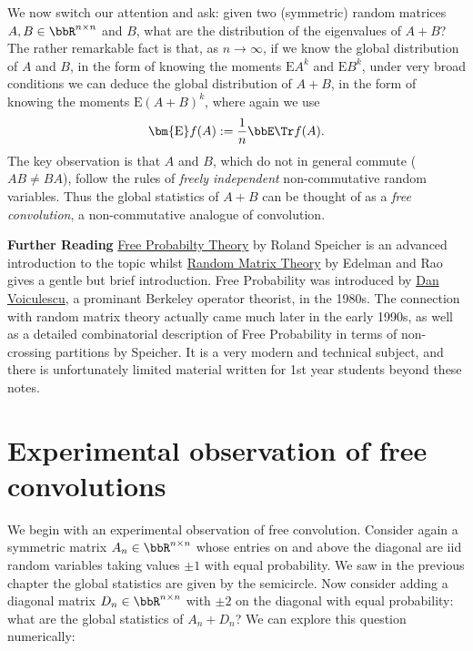 We now switch our attention and ask: given two (symmetric) random matrices $A, B \ensuremath{\in} \ensuremath{\bbR}^{n \ensuremath{\times} n}$  and $B$, what are the distribution of the eigenvalues of $A+B$?  The rather remarkable fact is that, as $n \ensuremath{\rightarrow} \ensuremath{\infty}$,  if we know the global distribution of $A$ and $B$, in the form of knowing the moments $\ensuremath{\bm{\mathrm{E}}} A^k$ and $\ensuremath{\bm{\mathrm{E}}} B^k$, under very broad conditions we can deduce the global distribution of $A+B$, in the form of knowing the moments $\ensuremath{\bm{\mathrm{E}}} (A+B)^k$, where again we use
\[
\ensuremath{\bm{\mathrm{E}}} f(A) := {1 \over n} \ensuremath{\bbE} \Tr f(A).
\]
The key observation is that $A$ and $B$, which do not in general commute ($AB \ensuremath{\neq} BA$), follow the rules of \emph{freely independent} non-commutative random variables. Thus the global statistics of $A+B$ can be thought of as a \emph{free convolution}, a non-commutative analogue of convolution. 

\textbf{Further Reading} \href{https://rolandspeicher.com/wp-content/uploads/2025/04/free-probability_v2.pdf}{Free Probabilty Theory} by Roland Speicher is an advanced introduction to the topic whilst \href{https://www.cambridge.org/core/services/aop-cambridge-core/content/view/B291B4E6728E10537C2406CE4C341923/S0962492904000236a.pdf/div-class-title-random-matrix-theory-div.pdf}{Random Matrix Theory} by Edelman and Rao gives a gentle but brief introduction.  Free Probability was introduced by \href{https://en.wikipedia.org/wiki/Dan-Virgil_Voiculescu}{Dan Voiculescu}, a prominant Berkeley operator theorist, in the 1980s. The connection with random matrix theory actually came much later in the early 1990s, as well as a detailed combinatorial description of Free Probability in terms of non-crossing partitions by Speicher.  It is a very modern and technical subject, and there is unfortunately limited material written for 1st year students beyond these notes.

\section{Experimental observation of free convolutions}
We begin with an experimental observation of free convolution. Consider again a symmetric matrix $A_n \ensuremath{\in} \ensuremath{\bbR}^{n \ensuremath{\times} n}$  whose entries on and above the diagonal are iid random variables taking values $\ensuremath{\pm}1$ with equal probability. We saw in the previous chapter the global statistics are given by the semicircle. Now consider adding a diagonal matrix $D_n \ensuremath{\in} \ensuremath{\bbR}^{n \ensuremath{\times} n}$ with $\ensuremath{\pm}2$ on the diagonal with equal probability: what are the global statistics of $A_n + D_n$? We can explore this question numerically:


